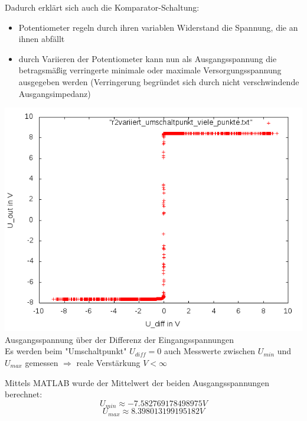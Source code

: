 \documentclass[compress,11pt]{beamer}
\begin{document}
\begin{frame}
Dadurch erklärt sich auch die Komparator-Schaltung:
\begin{itemize}
\item Potentiometer regeln durch ihren variablen Widerstand die Spannung, die an ihnen abfällt
\item durch Variieren der Potentiometer kann nun als Ausgangsspannung die betragsmäßig verringerte minimale oder maximale Versorgungsspannung ausgegeben werden (Verringerung begründet sich durch nicht verschwindende Ausgangsimpedanz)
\end{itemize}
\end{frame}
\begin{frame}
\includegraphics[width=.7\textwidth]{1aufgabe/r2variiert}\\
Ausgangsspannung über der Differenz der Eingangsspannungen\\ 
Es werden beim "Umschaltpunkt" $U_{diff} = 0$ auch Messwerte zwischen $U_{min}$ und $U_{max}$ gemessen $\Rightarrow$ reale Verstärkung $V < \infty $ \\


\end{frame}
\begin{frame}
Mittels MATLAB wurde der Mittelwert der beiden Ausgangsspannungen berechnet:
\begin{equation}
U_{min} \approx -7.582769178498975 V 
\end{equation}
\begin{equation}
U_{max} \approx 8.398013199195182 V
\end{equation}
\end{frame} 
\end{document}
